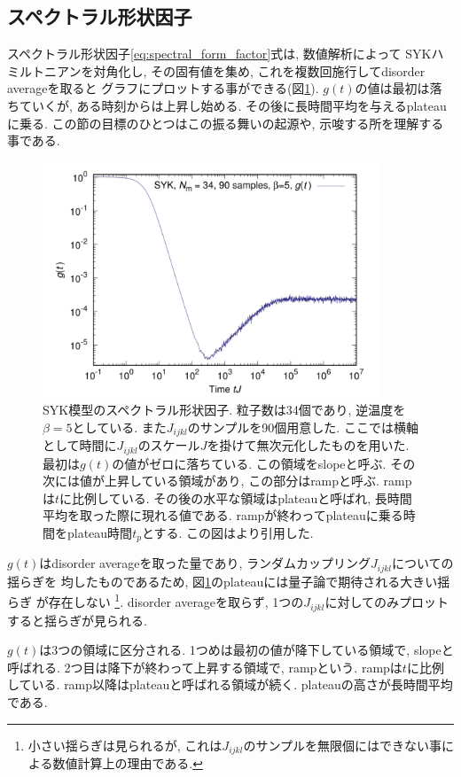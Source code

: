 \subsection{スペクトラル形状因子}
スペクトラル形状因子\eqref{eq:spectral_form_factor}式は, 数値解析によって
SYKハミルトニアンを対角化し, その固有値を集め, これを複数回施行してdisorder averageを取ると
グラフにプロットする事ができる(図\ref{fig:spectralformfactor}). 
$g(t)$の値は最初は落ちていくが, ある時刻からは上昇し始める. 
その後に長時間平均を与えるplateauに乗る. 
この節の目標のひとつはこの振る舞いの起源や, 示唆する所を理解する事である. 
\begin{figure}[ht]
	\centering
	\includegraphics[width=10cm]{figures/spectralformfactor}
	\caption{SYK模型のスペクトラル形状因子. 粒子数は34個であり, 逆温度を$\beta = 5$としている. 
		また$J_{ijkl}$のサンプルを90個用意した. 
		ここでは横軸として時間に$J_{ijkl}$のスケール$J$を掛けて無次元化したものを用いた. 
		最初は$g(t)$の値がゼロに落ちている. この領域をslopeと呼ぶ. 
		その次には値が上昇している領域があり, この部分はrampと呼ぶ. 
		rampは$t$に比例している. 
		その後の水平な領域はplateauと呼ばれ, 長時間平均を取った際に現れる値である. 
		rampが終わってplateauに乗る時間をplateau時間$t_p$とする. 
		この図は\cite{polchinski_chaos}より引用した. 
	}
	\label{fig:spectralformfactor}
\end{figure}

$g(t)$はdisorder averageを取った量であり, ランダムカップリング$J_{ijkl}$についての揺らぎを
均したものであるため, 図\ref{fig:spectralformfactor}のplateauには量子論で期待される大きい揺らぎ
が存在しない
\footnote{小さい揺らぎは見られるが, 
	これは$J_{ijkl}$のサンプルを無限個にはできない事による数値計算上の理由である. }. 
disorder averageを取らず, 
1つの$J_{ijkl}$に対してのみプロットすると揺らぎが見られる\cite{polchinski_chaos}. 

$g(t)$は3つの領域に区分される. 
1つめは最初の値が降下している領域で, slopeと呼ばれる. 
2つ目は降下が終わって上昇する領域で, rampという. rampは$t$に比例している. 
ramp以降はplateauと呼ばれる領域が続く. plateauの高さが長時間平均である. 

